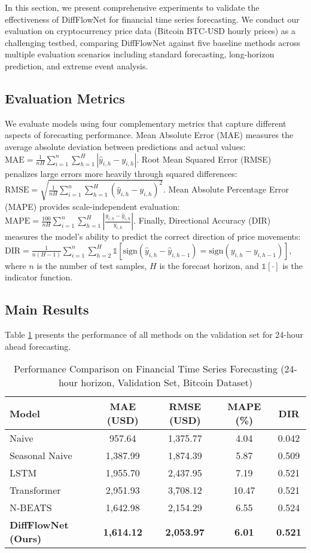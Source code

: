 \documentclass[11pt,a4paper]{article}
\begin{document}
In this section, we present comprehensive experiments to validate the effectiveness of DiffFlowNet for financial time series forecasting. We conduct our evaluation on cryptocurrency price data (Bitcoin BTC-USD hourly prices) as a challenging testbed, comparing DiffFlowNet against five baseline methods across multiple evaluation scenarios including standard forecasting, long-horizon prediction, and extreme event analysis.

\subsection{Evaluation Metrics}

We evaluate models using four complementary metrics that capture different aspects of forecasting performance. Mean Absolute Error (MAE) measures the average absolute deviation between predictions and actual values: $\text{MAE} = \frac{1}{nH}\sum_{i=1}^n \sum_{h=1}^H |\hat{y}_{i,h} - y_{i,h}|$. Root Mean Squared Error (RMSE) penalizes large errors more heavily through squared differences: $\text{RMSE} = \sqrt{\frac{1}{nH}\sum_{i=1}^n \sum_{h=1}^H (\hat{y}_{i,h} - y_{i,h})^2}$. Mean Absolute Percentage Error (MAPE) provides scale-independent evaluation: $\text{MAPE} = \frac{100}{nH}\sum_{i=1}^n \sum_{h=1}^H \left|\frac{y_{i,h} - \hat{y}_{i,h}}{y_{i,h}}\right|$. Finally, Directional Accuracy (DIR) measures the model's ability to predict the correct direction of price movements: $\text{DIR} = \frac{1}{n(H-1)}\sum_{i=1}^n \sum_{h=2}^H \mathbb{1}[\text{sign}(\hat{y}_{i,h} - \hat{y}_{i,h-1}) = \text{sign}(y_{i,h} - y_{i,h-1})]$, where $n$ is the number of test samples, $H$ is the forecast horizon, and $\mathbb{1}[\cdot]$ is the indicator function.

\subsection{Main Results}

Table \ref{tab:main_results} presents the performance of all methods on the validation set for 24-hour ahead forecasting.

\begin{table}[htbp]
\centering
\caption{Performance Comparison on Financial Time Series Forecasting (24-hour horizon, Validation Set, Bitcoin Dataset)}
\label{tab:main_results}
\begin{tabular}{lcccc}
\toprule
\textbf{Model} & \textbf{MAE (USD)} & \textbf{RMSE (USD)} & \textbf{MAPE (\%)} & \textbf{DIR} \\
\midrule
Naive & 957.64 & 1,375.77 & 4.04 & 0.042 \\
Seasonal Naive & 1,387.99 & 1,874.39 & 5.87 & 0.509 \\
\midrule
LSTM & 1,955.70 & 2,437.95 & 7.19 & 0.521 \\
Transformer & 2,951.93 & 3,708.12 & 10.47 & 0.521 \\
N-BEATS & 1,642.98 & 2,154.29 & 6.55 & 0.524 \\
\midrule
\textbf{DiffFlowNet (Ours)} & \textbf{1,614.12} & \textbf{2,053.97} & \textbf{6.01} & \textbf{0.521} \\
\bottomrule
\end{tabular}
\end{table}
\end{document}
